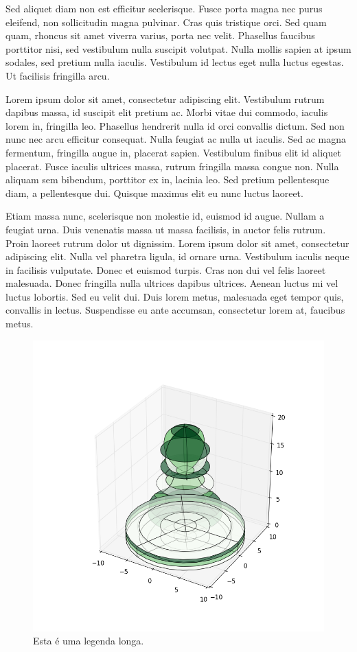 \documentclass{article}
\begin{document}
	Sed aliquet diam non est efficitur scelerisque. Fusce porta magna nec purus eleifend, non sollicitudin magna pulvinar. Cras quis tristique orci. Sed quam quam, rhoncus sit amet viverra varius, porta nec velit. Phasellus faucibus porttitor nisi, sed vestibulum nulla suscipit volutpat. Nulla mollis sapien at ipsum sodales, sed pretium nulla iaculis. Vestibulum id lectus eget nulla luctus egestas. Ut facilisis fringilla arcu.
	
	Lorem ipsum dolor sit amet, consectetur adipiscing elit. Vestibulum rutrum dapibus massa, id suscipit elit pretium ac. Morbi vitae dui commodo, iaculis lorem in, fringilla leo. Phasellus hendrerit nulla id orci convallis dictum. Sed non nunc nec arcu efficitur consequat. Nulla feugiat ac nulla ut iaculis. Sed ac magna fermentum, fringilla augue in, placerat sapien. Vestibulum finibus elit id aliquet placerat. Fusce iaculis ultrices massa, rutrum fringilla massa congue non. Nulla aliquam sem bibendum, porttitor ex in, lacinia leo. Sed pretium pellentesque diam, a pellentesque dui. Quisque maximus elit eu nunc luctus laoreet.
	
	Etiam massa nunc, scelerisque non molestie id, euismod id augue. Nullam a feugiat urna. Duis venenatis massa ut massa facilisis, in auctor felis rutrum. Proin laoreet rutrum dolor ut dignissim. Lorem ipsum dolor sit amet, consectetur adipiscing elit. Nulla vel pharetra ligula, id ornare urna. Vestibulum iaculis neque in facilisis vulputate. Donec et euismod turpis. Cras non dui vel felis laoreet malesuada. Donec fringilla nulla ultrices dapibus ultrices. Aenean luctus mi vel luctus lobortis. Sed eu velit dui. Duis lorem metus, malesuada eget tempor quis, convallis in lectus. Suspendisse eu ante accumsan, consectetur lorem at, faucibus metus.
	
	\begin{figure}[H]
		\centering
		\includegraphics[width=0.7\linewidth]{figuras/figure_3}
		\caption[Leganda Curta]{Esta é uma legenda longa.}
		\label{fig:figure_3}
	\end{figure}
	
\end{document}

